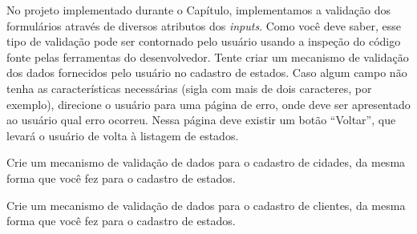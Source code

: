 \begin{projetoSemArquivo}{}{}{}
    No projeto implementado durante o Capítulo, implementamos a validação dos formulários através de diversos atributos dos \textit{inputs}. Como você deve saber, esse tipo de validação pode ser contornado pelo usuário usando a inspeção do código fonte pelas ferramentas do desenvolvedor. Tente criar um mecanismo de validação dos dados fornecidos pelo usuário no cadastro de estados. Caso algum campo não tenha as características necessárias (sigla com mais de dois caracteres, por exemplo), direcione o usuário para uma página de erro, onde deve ser apresentado ao usuário qual erro ocorreu. Nessa página deve existir um botão ``Voltar'', que levará o usuário de volta à listagem de estados.
\end{projetoSemArquivo}

\begin{projetoSemArquivo}{}{}{}
    Crie um mecanismo de validação de dados para o cadastro de cidades, da mesma forma que você fez para o cadastro de estados.
\end{projetoSemArquivo}

\begin{projetoSemArquivo}{}{}{}
    Crie um mecanismo de validação de dados para o cadastro de clientes, da mesma forma que você fez para o cadastro de estados.
\end{projetoSemArquivo}